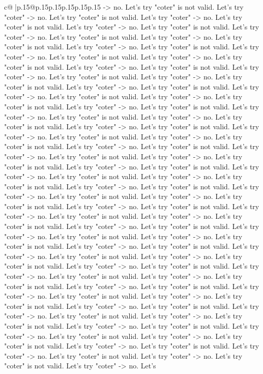 \documentclass{article}
\begin{document}
{\begin{supertabular}{c@{$\;$}|p{.15\linewidth}@{}p{.15\linewidth}p{.15\linewidth}p{.15\linewidth}p{.15\linewidth}p{.15\linewidth}}
{{{{-}> no. Let's try "coter" is not valid. Let's try "coter" {-}> no. Let's try "coter" is not valid. Let's try "coter" {-}> no. Let's try "coter" is not valid. Let's try "coter" {-}> no. Let's try "coter" is not valid. Let's try "coter" {-}> no. Let's try "coter" is not valid. Let's try "coter" {-}> no. Let's try "coter" is not valid. Let's try "coter" {-}> no. Let's try "coter" is not valid. Let's try "coter" {-}> no. Let's try "coter" is not valid. Let's try "coter" {-}> no. Let's try "coter" is not valid. Let's try "coter" {-}> no. Let's try "coter" is not valid. Let's try "coter" {-}> no. Let's try "coter" is not valid. Let's try "coter" {-}> no. Let's try "coter" is not valid. Let's try "coter" {-}> no. Let's try "coter" is not valid. Let's try "coter" {-}> no. Let's try "coter" is not valid. Let's try "coter" {-}> no. Let's try "coter" is not valid. Let's try "coter" {-}> no. Let's try "coter" is not valid. Let's try "coter" {-}> no. Let's try "coter" is not valid. Let's try "coter" {-}> no. Let's try "coter" is not valid. Let's try "coter" {-}> no. Let's try "coter" is not valid. Let's try "coter" {-}> no. Let's try "coter" is not valid. Let's try "coter" {-}> no. Let's try "coter" is not valid. Let's try "coter" {-}> no. Let's try "coter" is not valid. Let's try "coter" {-}> no. Let's try "coter" is not valid. Let's try "coter" {-}> no. Let's try "coter" is not valid. Let's try "coter" {-}> no. Let's try "coter" is not valid. Let's try "coter" {-}> no. Let's try "coter" is not valid. Let's try "coter" {-}> no. Let's try "coter" is not valid. Let's try "coter" {-}> no. Let's try "coter" is not valid. Let's try "coter" {-}> no. Let's try "coter" is not valid. Let's try "coter" {-}> no. Let's try "coter" is not valid. Let's try "coter" {-}> no. Let's try "coter" is not valid. Let's try "coter" {-}> no. Let's try "coter" is not valid. Let's try "coter" {-}> no. Let's try "coter" is not valid. Let's try "coter" {-}> no. Let's try "coter" is not valid. Let's try "coter" {-}> no. Let's try "coter" is not valid. Let's try "coter" {-}> no. Let's try "coter" is not valid. Let's try "coter" {-}> no. Let's try "coter" is not valid. Let's try "coter" {-}> no. Let's try "coter" is not valid. Let's try "coter" {-}> no. Let's try "coter" is not valid. Let's try "coter" {-}> no. Let's try "coter" is not valid. Let's try "coter" {-}> no. Let's try "coter" is not valid. Let's try "coter" {-}> no. Let's try "coter" is not valid. Let's try "coter" {-}> no. Let's try "coter" is not valid. Let's try "coter" {-}> no. Let's try "coter" is not valid. Let's try "coter" {-}> no. Let's try "coter" is not valid. Let's try "coter" {-}> no. Let's try "coter" is not valid. Let's try "coter" {-}> no. Let's try "coter" is not valid. Let's try "coter" {-}> no. Let's try "coter" is not valid. Let's try "coter" {-}> no. Let's try "coter" is not valid. Let's try "coter" {-}> no. Let's try "coter" is not valid. Let's try "coter" {-}> no. Let's try "coter" is not valid. Let's try "coter" {-}> no. Let's try "coter" is not valid. Let's try "coter" {-}> no. Let's try "coter" is not valid. Let's try "coter" {-}> no. Let's try "coter" is not valid. Let's try "coter" {-}> no. Let's }}}
\end{supertabular}}
\end{document}
